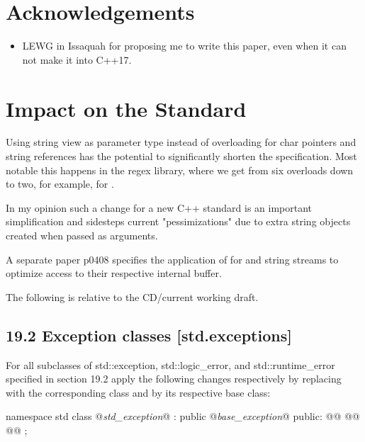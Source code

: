 \documentclass[ebook,11pt,article]{memoir}
\begin{document}
\chapter{Acknowledgements}
\begin{itemize}
\item LEWG in Issaquah for proposing me to write this paper, even when it can not make it into C++17.
\end{itemize}




\chapter{Impact on the Standard}
Using string view as parameter type instead of overloading for char pointers and string references has the potential to significantly shorten the specification. Most notable this happens in the regex library, where we get from six overloads down to two, for example, for .

In my opinion such a change for a new C++ standard is an important simplification and sidesteps current "pessimizations" due to extra string objects created when passed as arguments.

A separate paper p0408 specifies the application of  for  and string streams to optimize access to their respective internal buffer.


The following is relative to the CD/current working draft.

\section{19.2 {Exception classes} [std.exceptions]}
For all subclasses of std::exception, std::logic_error, and std::runtime_error specified in section 19.2 apply the following changes respectively by replacing \emph{} with the corresponding class and \emph{} by its respective base class:


\begin{codeblock}
namespace std {
  class @\emph{std_exception}@ : public @\emph{base_exception}@ {
  public:
    @@
    @@
    @@
  };
}
\end{codeblock}
\end{document}
